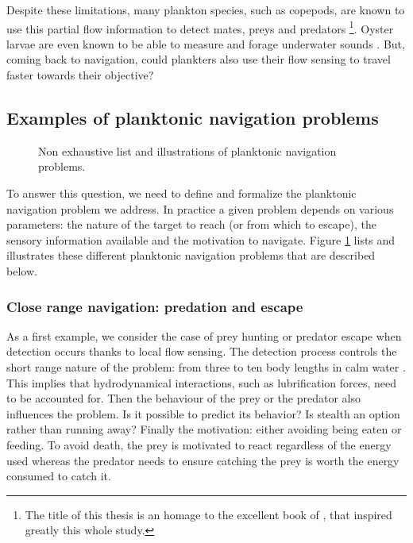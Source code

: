 Despite these limitations, many plankton species, such as copepods, are known to use this partial flow information to detect mates, preys and predators \citep{kiorboe1999predator, kiorboe1999hydrodynamic, jiang2002hydrodynamic, kiorboe2018mechanistic}\footnote{The title of this thesis is an homage to the excellent book of \citet{kiorboe2018mechanistic}, that inspired greatly this whole study.}.
Oyster larvae are even known to be able to measure and forage underwater sounds \citep{williams2022oyster}. 
But, coming back to navigation, could plankters also use their flow sensing to travel faster towards their objective?

\subsection{Examples of planktonic navigation problems}

\begin{figure}
	\centering
	\def\svgwidth{0.9\textwidth}
	
  	\caption{
  		Non exhaustive list and illustrations of planktonic navigation problems.
  	}
  	\label{fig:planktonic_navigation_problems}
\end{figure}
To answer this question, we need to define and formalize the planktonic navigation problem we address.
In practice a given problem depends on various parameters: the nature of the target to reach (or from which to escape), the sensory information available and the motivation to navigate.
Figure \ref{fig:planktonic_navigation_problems} lists and illustrates these different planktonic navigation problems that are described below.

\subsubsection{Close range navigation: predation and escape}

As a first example, we consider the case of prey hunting or predator escape when detection occurs thanks to local flow sensing.
The detection process controls the short range nature of the problem: from three to ten body lengths in calm water \citep{fields2010orientation}. 
This implies that hydrodynamical interactions, such as lubrification forces, need to be accounted for.
Then the behaviour of the prey or the predator also influences the problem. 
Is it possible to predict its behavior? 
Is stealth an option rather than running away?
Finally the motivation: either avoiding being eaten or feeding. 
To avoid death, the prey is motivated to react regardless of the energy used whereas the predator needs to ensure catching the prey is worth the energy consumed to catch it.

